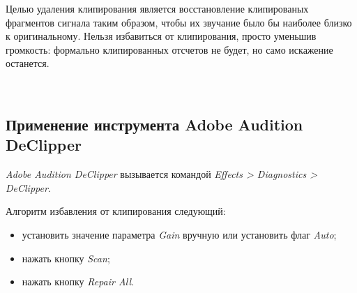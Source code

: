 \documentclass{beamer}
\begin{document}
\begin{frame}
Целью удаления клипирования является восстановление клипированых фрагментов сигнала таким образом, чтобы их звучание было бы наиболее близко к оригинальному. Нельзя избавиться от клипирования, просто уменьшив громкость: формально клипированных отсчетов не будет, но само искажение останется.

~

\end{frame}


\subsection{Применение инструмента Adobe Audition DeClipper}
\begin{frame}
\textit{Adobe Audition DeClipper} вызывается командой \textit{Effects > Diagnostics > DeClipper}.


Алгоритм избавления от клипирования следующий:
\begin{itemize}
\item установить значение параметра \textit{Gain} вручную или установить флаг \textit{Auto};
\item нажать кнопку \textit{Scan};
\item нажать кнопку \textit{Repair All}.
\end{itemize}
\end{frame}
\end{document}
